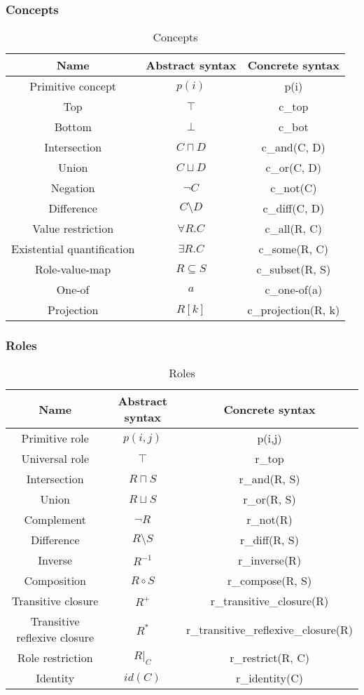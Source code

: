 \documentclass{article}
\begin{document}
\subsubsection{Concepts}

\begin{table}[H]
    \centering
    \begin{tabular}{ccc}
    Name & Abstract syntax & Concrete syntax \\
    \hline
    Primitive concept & $p(i)$ & p(i) \\
    Top & $\top$ & c\_top \\
    Bottom & $\bot$ & c\_bot \\
    Intersection & $C\sqcap D$ & c\_and(C, D) \\
    Union & $C\sqcup D$ & c\_or(C, D) \\
    Negation & $\neg C$ & c\_not(C) \\
    Difference & $C\setminus D$ & c\_diff(C, D) \\
    Value restriction & $\forall R.C$ & c\_all(R, C) \\
    Existential quantification & $\exists R.C$ & c\_some(R, C) \\
    Role-value-map & $R\subseteq S$ & c\_subset(R, S) \\
    One-of & $a$ & c\_one-of(a) \\
    Projection & $R[k]$ & c\_projection(R, k) \\
    \end{tabular}
    \caption{Concepts}
\end{table}

\subsubsection{Roles}

\begin{table}[H]
    \centering
    \begin{tabular}{ccc}
    Name & Abstract syntax & Concrete syntax \\
    \hline
    Primitive role & $p(i,j)$ & p(i,j) \\
    Universal role & $\top$ & r\_top \\
    Intersection & $R\sqcap S$ & r\_and(R, S) \\
    Union & $R\sqcup S$ & r\_or(R, S) \\
    Complement & $\neg R$ & r\_not(R) \\
    Difference & $R\setminus S$ & r\_diff(R, S) \\
    Inverse & $R^{-1}$ & r\_inverse(R) \\
    Composition & $R\circ S$ & r\_compose(R, S) \\
    Transitive closure & $R^+$ & r\_transitive\_closure(R) \\
    Transitive reflexive closure & $R^*$ & r\_transitive\_reflexive\_closure(R) \\
    Role restriction & $R\vert_{C}$ & r\_restrict(R, C) \\
    Identity & $\mathit{id}(C)$ & r\_identity(C) \\
    \end{tabular}
    \caption{Roles}
\end{table}
\end{document}
